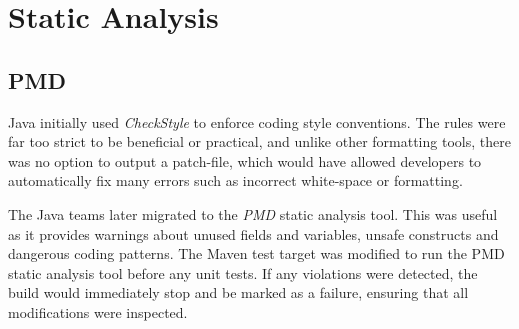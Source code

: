 \section{Static Analysis}
\subsection{PMD}
\par
Java initially used \textit{CheckStyle}\cite{CheckStyle} to enforce coding style conventions. The rules were far too strict to be beneficial or practical, and unlike other formatting tools, there was no option to output a patch-file, which would have allowed developers to automatically fix many errors such as incorrect white-space or formatting.

\par
The Java teams later migrated to the \textit{PMD}\cite{PMD} static analysis tool. This was useful as it provides warnings about unused fields and variables, unsafe constructs and dangerous coding patterns. The Maven test target was modified to run the PMD static analysis tool before any unit tests. If any violations were detected, the build would immediately stop and be marked as a failure, ensuring that all modifications were inspected.
